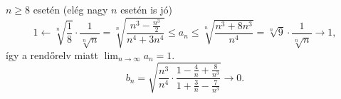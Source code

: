 \documentclass[11pt]{scrartcl}
\begin{document}
$n \ge 8$ esetén (elég nagy $n$ esetén is jó)
\[
	1
	\leftarrow \sqrt[n]{\frac{1}{8}} \cdot \frac{1}{\sqrt[n]{n}}
	= \sqrt[n]{\frac{n^3 - \frac{n^3}{2}}{n^4 + 3n^4}}
	\le a_n
	\le \sqrt[n]{\frac{n^3 + 8n^3}{n^4}}
	= \sqrt[n]{9} \cdot \frac{1}{\sqrt[n]{n}}
	\to 1,
\]
így a rendőrelv miatt $\lim_{n \to \infty} a_n = 1$.
\[
	b_n
	= \sqrt{
		\frac{n^3}{n^4} \cdot
		\frac{1 - \frac{4}{n} + \frac{8}{n^3}}{1 + \frac{3}{n} - \frac{7}{n^3}}
	}
	\to 0.
\]
\end{document}
